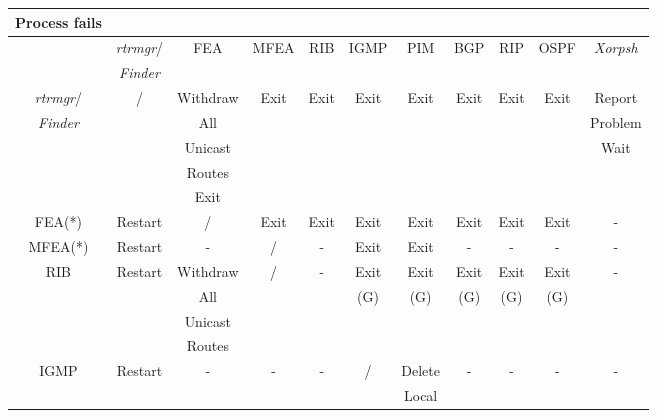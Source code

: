 \documentclass[11pt]{article}
\makeatletter
\newcommand{\finder} {{\em Finder}\@\xspace}
\newcommand{\xorpsh} {{\em Xorpsh}\@\xspace}
\newcommand{\rtrmgr} {{\em rtrmgr}\@\xspace}
\makeatother
\begin{document}
\begin{table}[ht]
\begin{center}
\begin{tabular}{|c|c|c|c|c|c|c|c|c|c|c|}
\hline
Process fails   &                 &          &      &      &      &         &      &      &      &         \\\hline
                & \rtrmgr/        & FEA      & MFEA & RIB  & IGMP & PIM     & BGP  & RIP  & OSPF & \xorpsh \\
                & \finder         &          &      &      &      &         &      &      &      &         \\\hline
\rtrmgr/        & /               & Withdraw & Exit & Exit & Exit & Exit    & Exit & Exit & Exit & Report  \\
\finder         &                 & All      &      &      &      &         &      &      &      & Problem \\
                &                 & Unicast  &      &      &      &         &      &      &      & Wait    \\
                &                 & Routes   &      &      &      &         &      &      &      &         \\
                &                 & Exit     &      &      &      &         &      &      &      &         \\\hline
FEA(*)          &  Restart        & /        & Exit & Exit & Exit & Exit    & Exit & Exit & Exit & -       \\\hline
MFEA(*)         &  Restart        & -        & /    & -    & Exit & Exit    & -    & -    & -    & -       \\\hline
RIB             &  Restart        & Withdraw & /    & -    & Exit & Exit    & Exit & Exit & Exit & -       \\
                &                 & All      &      &      & (G)  & (G)     & (G)  & (G)  & (G)  &         \\
                &                 & Unicast  &      &      &      &         &      &      &      &         \\
                &                 & Routes   &      &      &      &         &      &      &      &         \\\hline
IGMP            &  Restart        & -        & -    & -    & /    & Delete  & -    & -    & -    & -       \\
                &                 &          &      &      &      & Local   &      &      &      &         \\

\end{tabular}
\end{center}
\end{table}
\end{document}
